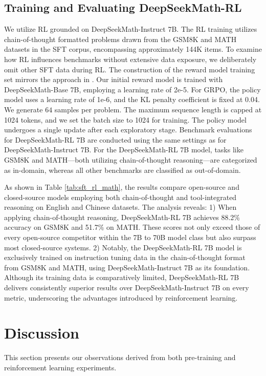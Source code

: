 \begin{itemize}[topsep=0pt]
\begin{itemize}[topsep=0pt]
\subsection{Training and Evaluating DeepSeekMath-RL}

We utilize RL grounded on DeepSeekMath-Instruct 7B. The RL training utilizes chain-of-thought formatted problems drawn from the GSM8K and MATH datasets in the SFT corpus, encompassing approximately 144K items. To examine how RL influences benchmarks without extensive data exposure, we deliberately omit other SFT data during RL. The construction of the reward model training set mirrors the approach in \citep{wang2023math}. Our initial reward model is trained with DeepSeekMath-Base 7B, employing a learning rate of 2e-5. For GRPO, the policy model uses a learning rate of 1e-6, and the KL penalty coefficient is fixed at 0.04. We generate $64$ samples per problem. The maximum sequence length is capped at 1024 tokens, and we set the batch size to 1024 for training. The policy model undergoes a single update after each exploratory stage. Benchmark evaluations for DeepSeekMath-RL 7B are conducted using the same settings as for DeepSeekMath-Instruct 7B. For the DeepSeekMath-RL 7B model, tasks like GSM8K and MATH—both utilizing chain-of-thought reasoning—are categorized as in-domain, whereas all other benchmarks are classified as out-of-domain.

As shown in Table \ref{tab:sft_rl_math}, the results compare open-source and closed-source models employing both chain-of-thought and tool-integrated reasoning on English and Chinese datasets. The analysis reveals: 1) When applying chain-of-thought reasoning, DeepSeekMath-RL 7B achieves 88.2\% accuracy on GSM8K and 51.7\% on MATH. These scores not only exceed those of every open-source competitor within the 7B to 70B model class but also surpass most closed-source systems. 2) Notably, the DeepSeekMath-RL 7B model is exclusively trained on instruction tuning data in the chain-of-thought format from GSM8K and MATH, using DeepSeekMath-Instruct 7B as its foundation. Although its training data is comparatively limited, DeepSeekMath-RL 7B delivers consistently superior results over DeepSeekMath-Instruct 7B on every metric, underscoring the advantages introduced by reinforcement learning.

\section{Discussion}
This section presents our observations derived from both pre-training and reinforcement learning experiments.


\end{itemize}
\end{itemize}
